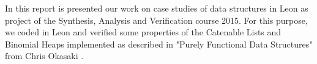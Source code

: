 In this report is presented our work on case studies of data structures in Leon
as project of the Synthesis, Analysis and Verification course 2015.
For this purpose, we coded in Leon and verified some properties of
the Catenable Lists and Binomial Heaps
implemented as described in "Purely Functional Data Structures" from Chris Okasaki
\cite{Okasaki}.


